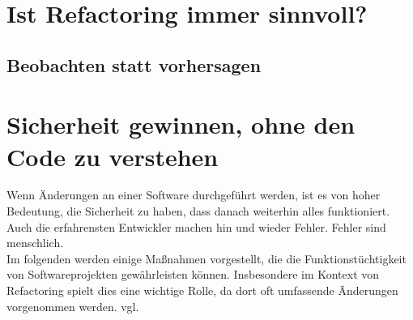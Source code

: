 \chapter{Ist Refactoring immer sinnvoll?}
\section{Beobachten statt vorhersagen}


\chapter{Sicherheit gewinnen, ohne den Code zu verstehen}
Wenn Änderungen an einer Software durchgeführt werden, ist es von hoher Bedeutung, die Sicherheit zu haben, dass danach weiterhin alles funktioniert.
Auch die erfahrensten Entwickler machen hin und wieder Fehler. Fehler sind menschlich.\\
Im folgenden werden einige Maßnahmen vorgestellt, die die Funktionstüchtigkeit von Softwareprojekten gewährleisten können. Insbesondere im Kontext von Refactoring spielt dies eine wichtige Rolle, da dort oft umfassende Änderungen vorgenommen werden. vgl. \citep[S. 323]{fiveLines.2023}

